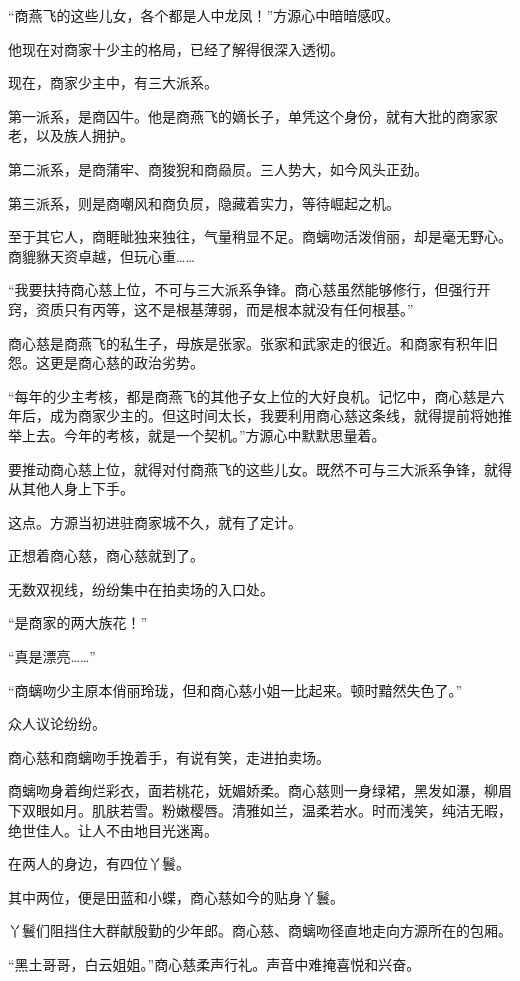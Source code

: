 \begin{this_body}
“商燕飞的这些儿女，各个都是人中龙凤！”方源心中暗暗感叹。

他现在对商家十少主的格局，已经了解得很深入透彻。

现在，商家少主中，有三大派系。

第一派系，是商囚牛。他是商燕飞的嫡长子，单凭这个身份，就有大批的商家家老，以及族人拥护。

第二派系，是商蒲牢、商狻猊和商赑屃。三人势大，如今风头正劲。

第三派系，则是商嘲风和商负屃，隐藏着实力，等待崛起之机。

至于其它人，商睚眦独来独往，气量稍显不足。商螭吻活泼俏丽，却是毫无野心。商貔貅天资卓越，但玩心重……

“我要扶持商心慈上位，不可与三大派系争锋。商心慈虽然能够修行，但强行开窍，资质只有丙等，这不是根基薄弱，而是根本就没有任何根基。”

商心慈是商燕飞的私生子，母族是张家。张家和武家走的很近。和商家有积年旧怨。这更是商心慈的政治劣势。

“每年的少主考核，都是商燕飞的其他子女上位的大好良机。记忆中，商心慈是六年后，成为商家少主的。但这时间太长，我要利用商心慈这条线，就得提前将她推举上去。今年的考核，就是一个契机。”方源心中默默思量着。

要推动商心慈上位，就得对付商燕飞的这些儿女。既然不可与三大派系争锋，就得从其他人身上下手。

这点。方源当初进驻商家城不久，就有了定计。

正想着商心慈，商心慈就到了。

无数双视线，纷纷集中在拍卖场的入口处。

“是商家的两大族花！”

“真是漂亮……”

“商螭吻少主原本俏丽玲珑，但和商心慈小姐一比起来。顿时黯然失色了。”

众人议论纷纷。

商心慈和商螭吻手挽着手，有说有笑，走进拍卖场。

商螭吻身着绚烂彩衣，面若桃花，妩媚娇柔。商心慈则一身绿裙，黑发如瀑，柳眉下双眼如月。肌肤若雪。粉嫩樱唇。清雅如兰，温柔若水。时而浅笑，纯洁无暇，绝世佳人。让人不由地目光迷离。

在两人的身边，有四位丫鬟。

其中两位，便是田蓝和小蝶，商心慈如今的贴身丫鬟。

丫鬟们阻挡住大群献殷勤的少年郎。商心慈、商螭吻径直地走向方源所在的包厢。

“黑土哥哥，白云姐姐。”商心慈柔声行礼。声音中难掩喜悦和兴奋。


\end{this_body}
